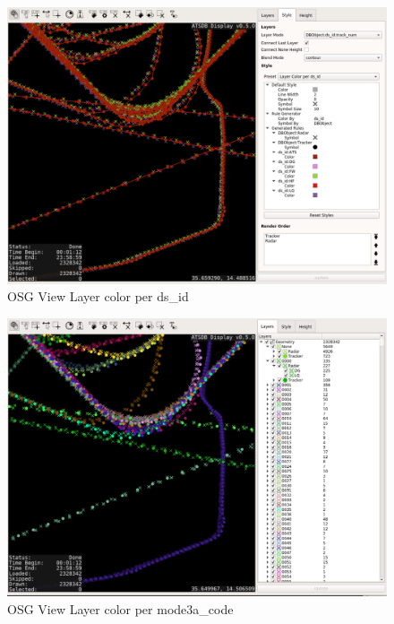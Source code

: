 \begin{figure}[H]
    \hspace*{-2.5cm}
    \includegraphics[width=19cm,frame]{../screenshots/osgview_style_ds_id.png}
  \caption{OSG View Layer color per ds\_id}
\end{figure}

\begin{figure}[H]
    \hspace*{-2.5cm}
    \includegraphics[width=19cm,frame]{../screenshots/osgview_style_mode3a_code.png}
  \caption{OSG View Layer color per mode3a\_code}
\end{figure}

